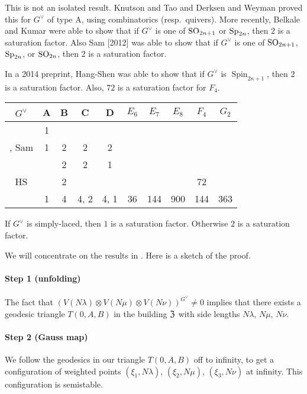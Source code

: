 \documentclass{article}
\begin{document}
This is not an isolated result. Knutson and Tao \cite{kt99} and 
Derksen and Weyman \cite{dw00} proved this for $G^\vee$ of type A, using 
combinatorics (resp.\ quivers). More recently, Belkale and 
Kumar \cite{bk10} were able to show that if $G^\vee$ is one of 
$\operatorname{SO}_{2n+1}$ or $\operatorname{Sp}_{2n}$, then $2$ is a 
saturation factor. Also Sam [2012] was able to show that if $G^\vee$ is one 
of $\operatorname{SO}_{2n+1}$, $\operatorname{Sp}_{2n}$, or 
$\operatorname{SO}_{2n}$, then $2$ is a saturation factor. 

In a 2014 preprint, Hang-Shen was able to show that if $G^\vee$ is 
$\operatorname{Spin}_{2n+1}$, then $2$ is a saturation factor. Also, 
$72$ is a saturation factor for $F_4$. 
\begin{center}
\begin{tabular}{c|c|c|c|c|c|c|c|c|c}
  $G^\vee$ & A & B & C & D & $E_6$ & $E_7$ & $E_8$ & $F_4$ & $G_2$ \\ \hline 
  \cite{kt99} & 1 \\
  \cite{dw00}, Sam & 1 & 2 & 2 & 2\\
  \cite{bk10} & & 2 & 2 & 1 \\
  HS & & 2 & & & & & & 72 \\
  \cite{km08} & 1 & 4 & 4, 2 & 4, 1 & 36 & 144 & 900 & 144 & 363
\end{tabular}
\end{center}

\begin{conjecture}
If $G^\vee$ is simply-laced, then $1$ is a saturation factor. Otherwise 
$2$ is a saturation factor. 
\end{conjecture}

We will concentrate on the results in \cite{km08}. Here is a sketch of the 
proof. 

\paragraph{Step 1 (unfolding)}
The fact that $(V(N\lambda)\otimes V(N\mu)\otimes V(N\nu))^{G^\vee}\ne 0$ 
implies that there exists a geodesic triangle $T(0,A,B)$ in the building 
$\mathfrak{Z}$ with side lengths $N\lambda$, $N\mu$, $N\nu$. 

\paragraph{Step 2 (Gauss map)}
We follow the geodesics in our triangle $T(0,A,B)$ off to infinity, to get 
a configuration of weighted points $(\xi_1,N\lambda)$, $(\xi_2,N\mu)$, 
$(\xi_3,N \nu)$ at infinity. This configuration is semistable. 
\end{document}
